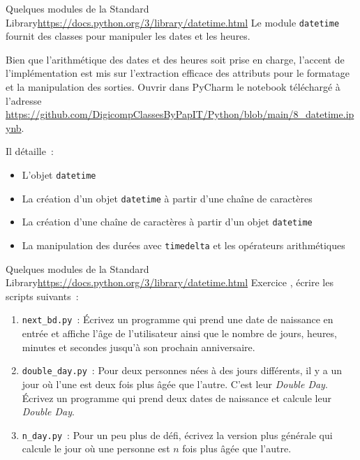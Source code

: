 \documentclass{beamer}
\begin{document}
    \begin{frame}{Quelques modules de la Standard Library}{\href{datetime}{https://docs.python.org/3/library/datetime.html}}
        Le module \lstinline{datetime} fournit des classes pour manipuler les dates et les heures.

        Bien que l'arithmétique des dates et des heures soit prise en charge, l'accent de l'implémentation est mis sur l'extraction efficace des attributs pour le formatage et la manipulation des sorties.
        \bigbreak
        Ouvrir dans PyCharm le notebook téléchargé à l'adresse \url{https://github.com/DigicompClassesByPapIT/Python/blob/main/8_datetime.ipynb}.

        Il détaille~:
        \begin{itemize}
            \item L'objet \lstinline{datetime}
            \item La création d'un objet \lstinline{datetime} à partir d'une chaîne de caractères
            \item La création d'une chaîne de caractères à partir d'un objet \lstinline{datetime}
            \item La manipulation des durées avec \lstinline{timedelta} et les opérateurs arithmétiques
        \end{itemize}
    \end{frame}

    \begin{frame}{Quelques modules de la Standard Library}{\href{datetime}{https://docs.python.org/3/library/datetime.html}}
        Exercice \execcounterdispinc, écrire les scripts suivants{}~:
        \begin{enumerate}
            \item \lstinline{next_bd.py}~: Écrivez un programme qui prend une date de naissance en entrée et affiche l'âge de l'utilisateur ainsi que le nombre de jours, heures, minutes et secondes jusqu'à son prochain anniversaire.
            \item \lstinline{double_day.py}~: Pour deux personnes nées à des jours différents, il y a un jour où l'une est deux fois plus âgée que l'autre. C'est leur \textit{Double Day}.
            Écrivez un programme qui prend deux dates de naissance et calcule leur \textit{Double Day}.
            \item \lstinline{n_day.py}~: Pour un peu plus de défi, écrivez la version plus générale qui calcule le jour où une personne est $n$ fois plus âgée que l'autre.
        \end{enumerate}
    \end{frame}
\end{document}
